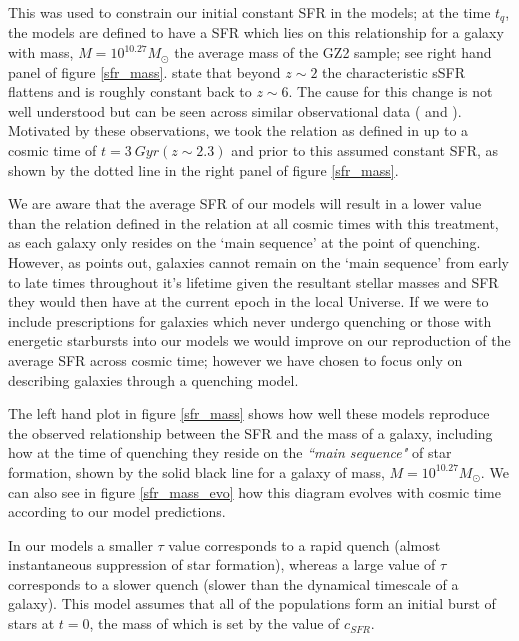 \documentclass{mn2e}
\begin{document}
 This was used to constrain our initial constant SFR in the models; at the time $t_{q}$, the models are defined to have a SFR which lies on this relationship for a galaxy with mass, $M = 10^{10.27} M_{\odot}$ the average mass of the GZ2 sample; see right hand panel of figure \ref{sfr_mass}. \citet{Peng} state that beyond $z \sim 2$ the characteristic sSFR flattens and is roughly constant back to $z\sim6$. The cause for this change is not well understood but can be seen across similar observational data (\cite{Gonzalez} and \cite{Beth}). Motivated by these observations, we took the relation as defined in \citet{Peng} up to a cosmic time of $t=3~Gyr (z \sim 2.3)$ and prior to this assumed constant SFR, as shown by the dotted line in the right panel of figure \ref{sfr_mass}.
 
We are aware that the average SFR of our models will result in a lower value than the relation defined in the \citet{Peng} relation at all cosmic times with this treatment, as each galaxy only resides on the `main sequence' at the point of quenching. However, as \citet{Beth} points out, galaxies cannot remain on the `main sequence' from early to late times throughout it's lifetime given the resultant stellar masses and SFR they would then have at the current epoch in the local Universe. If we were to include prescriptions for galaxies which never undergo quenching or those with energetic starbursts into our models we would improve on our reproduction of the average SFR across cosmic time; however we have chosen to focus only on describing galaxies through a quenching model. 

The left hand plot in figure \ref{sfr_mass} shows how well these models reproduce the observed relationship between the SFR and the mass of a galaxy, including how at the time of quenching they reside on the \emph{``main sequence"} of star formation, shown by the solid black line for a galaxy of mass, $M = 10^{10.27} M_{\odot}$.  We can also see in figure \ref{sfr_mass_evo} how this diagram evolves with cosmic time according to our model predictions. 



In our models a smaller $\tau$ value corresponds to a rapid quench (almost instantaneous suppression of star formation), whereas a large value of $\tau$ corresponds to a slower quench (slower than the dynamical timescale of a galaxy).  This model assumes that all of the populations form an initial burst of stars at $t=0$, the mass of which is set by the value of $c_{SFR}$. %
\end{document}
